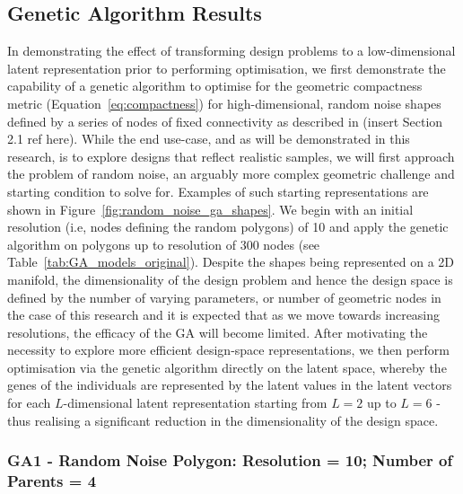 \documentclass{article}
\begin{document}
\subsection{Genetic Algorithm Results}
In demonstrating the effect of transforming design problems to a low-dimensional latent representation prior to performing optimisation, we first demonstrate the capability of a genetic algorithm to optimise for the geometric compactness metric (Equation~\eqref{eq:compactness}) for high-dimensional, random noise shapes defined by a series of nodes of fixed connectivity as described in (insert Section 2.1 ref here). While the end use-case, and as will be demonstrated in this research, is to explore designs that reflect realistic samples, we will first approach the problem of random noise, an arguably more complex geometric challenge and starting condition to solve for. Examples of such starting representations are shown in Figure~\ref{fig:random_noise_ga_shapes}. We begin with an initial resolution (i.e, nodes defining the random polygons) of 10 and apply the genetic algorithm on polygons up to resolution of 300 nodes (see Table~\ref{tab:GA_models_original}). Despite the shapes being represented on a 2D manifold, the dimensionality of the design problem and hence the design space is defined by the number of varying parameters, or number of geometric nodes in the case of this research and it is expected that as we move towards increasing resolutions, the efficacy of the GA will become limited. After motivating the necessity to explore more efficient design-space representations, we then perform optimisation via the genetic algorithm directly on the latent space, whereby the genes of the individuals are represented by the latent values in the latent vectors for each $L$-dimensional latent representation starting from $L=2$ up to $L=6$ - thus realising a significant reduction in the dimensionality of the design space.

\subsubsection{GA1 - Random Noise Polygon: Resolution = 10; Number of Parents = 4}
\end{document}
